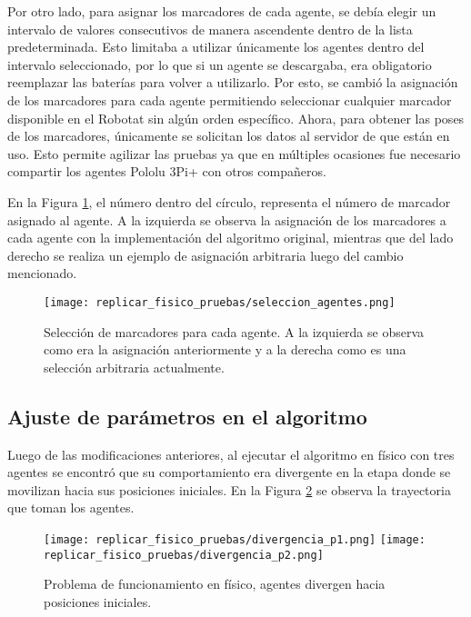 Por otro lado, para asignar los marcadores de cada agente, se debía elegir un intervalo  de valores consecutivos de manera ascendente dentro de la lista predeterminada. Esto limitaba a utilizar únicamente los agentes dentro del intervalo seleccionado, por lo que si un agente se descargaba, era obligatorio reemplazar las baterías para volver a utilizarlo. Por esto, se cambió la asignación de los marcadores para cada agente permitiendo seleccionar cualquier marcador disponible en el Robotat sin algún orden específico. Ahora, para obtener las poses de los marcadores, únicamente se solicitan los datos al servidor de que están en uso. Esto permite agilizar las pruebas ya que en múltiples ocasiones fue necesario compartir los agentes Pololu 3Pi+ con otros compañeros.

En la Figura \ref{fig:seleccion_agentes}, el número dentro del círculo, representa el número de marcador asignado al agente. A la izquierda se observa la asignación de los marcadores a cada agente con la implementación del algoritmo original, mientras que del lado derecho se realiza un ejemplo de asignación arbitraria luego del cambio mencionado.

\begin{figure}[H]
	\centering
	\texttt{[image: replicar\_fisico\_pruebas/seleccion\_agentes.png]}
	\caption{Selección de marcadores para cada agente. A la izquierda se observa como era la asignación anteriormente y a la derecha como es una selección arbitraria actualmente.}
	\label{fig:seleccion_agentes}
\end{figure}


\subsection{Ajuste de parámetros en el algoritmo}
Luego de las modificaciones anteriores, al ejecutar el algoritmo en físico con tres agentes se encontró que su comportamiento era divergente en la etapa donde se movilizan hacia sus posiciones iniciales. En la Figura \ref{fig:divergencia1} se observa la trayectoria que toman los agentes.

\begin{figure}[H]
	\centering
	\texttt{[image: replicar\_fisico\_pruebas/divergencia\_p1.png]}
	\texttt{[image: replicar\_fisico\_pruebas/divergencia\_p2.png]}
	\caption{Problema de funcionamiento en físico, agentes divergen hacia posiciones iniciales. }
	\label{fig:divergencia1}
\end{figure}

